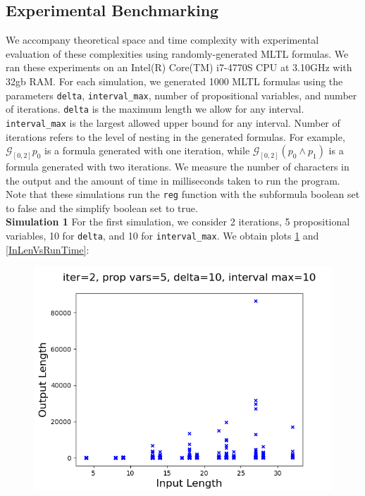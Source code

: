 \documentclass[runningheads]{llncs}
\begin{document}
\subsection{Experimental Benchmarking}
We accompany theoretical space and time complexity with experimental evaluation of these complexities using randomly-generated MLTL formulas.
We ran these experiments on an Intel(R) Core(TM) i7-4770S CPU at 3.10GHz with 32gb RAM.
For each simulation, we generated 1000 MLTL formulas using the parameters \texttt{delta}, \texttt{interval\_max}, number of propositional variables, and number of iterations. \texttt{delta} is the maximum length we allow for any interval. \texttt{interval\_max} is the largest allowed upper bound for any interval. Number of iterations refers to the level of nesting in the generated formulas. For example, $\mathcal{G}_{[0,2]}p_0$ is a formula generated with one iteration, while $\mathcal{G}_{[0,2]}(p_0 \land p_1)$ is a formula generated with two iterations. We measure the number of characters in the output and the amount of time in milliseconds taken to run the program. Note that these simulations run the \texttt{reg} function with the subformula boolean set to false and the simplify boolean set to true.\\
\noindent\textbf{Simulation 1}
For the first simulation, we consider 2 iterations, 5 propositional variables, 10 for \texttt{delta}, and 10 for \texttt{interval\_max}. We obtain plots \ref{InVsOutputLen} and \ref{InLenVsRunTime}:\\
\begin{minipage}{0.5 \textwidth}
    \begin{figure}[H]
    \centering
    \includegraphics[scale=0.35]{images/Sim1Length_large.png}
    \label{InVsOutputLen}
    \end{figure}
\end{minipage}
\end{document}
